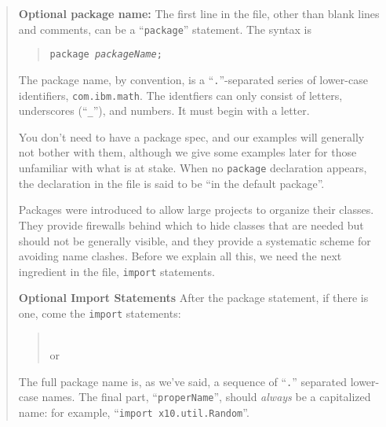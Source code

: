 \begin{quote}
{\bf Optional package name:}  The first line in the file, other than blank lines and
comments, can be a ``{\tt package}'' statement.  The syntax is
\begin{quote}{\tt package {\em packageName};}\end{quote}
The package name, by convention, is a ``{\tt .}''-separated  series of
lower-case identifiers, \eg{} {\tt com.ibm.math}.  The identfiers can only
consist of letters, underscores (``{\tt \_}''), and numbers. It must begin with
a letter.

You don't need to have a package spec, and our examples will generally not
bother with them, although we give some examples later for those unfamiliar
with what is at stake.   When no {\tt package} declaration appears, the
declaration in the file is said to be ``in the default package''.

Packages were introduced to allow large projects to organize
their classes.  They provide firewalls behind which to hide classes that are
needed but should not be generally visible, and they provide a systematic scheme
for avoiding name clashes. Before we explain all this, we need the next
ingredient in the file, {\tt import} statements.

{\bf Optional Import Statements}  After the package statement, if there is one,
come the {\tt import} statements:
\begin{quote}\\
or\\
\end{quote}

The full package name is, as we've said, a sequence of ``{\tt .}'' separated
lower-case names. The final part, ``{\tt properName}'', should {\em always} be a
capitalized name: for example, ``{\tt import x10.util.Ran\-dom}''. 


\end{quote}
